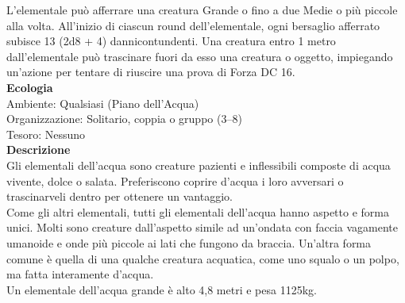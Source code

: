 \begin{multicols}{2}
L'elementale può afferrare una creatura Grande o fino a due Medie o più piccole alla volta. All'inizio di ciascun round dell'elementale, ogni bersaglio afferrato subisce 13 (2d8 + 4) dannicontundenti. Una creatura entro 1 metro dall'elementale può trascinare fuori da esso una  creatura o oggetto, impiegando un'azione per tentare di riuscire una prova di Forza DC  16.\\
\textbf{Ecologia}\\
Ambiente: Qualsiasi (Piano dell'Acqua)\\
Organizzazione: Solitario, coppia o gruppo (3–8)\\
Tesoro: Nessuno\\
\textbf{Descrizione}\\
Gli elementali dell'acqua sono creature pazienti e inflessibili composte di acqua vivente, dolce o salata. Preferiscono coprire d’acqua i loro avversari o trascinarveli dentro per ottenere un vantaggio.\\
Come gli altri elementali, tutti gli elementali dell'acqua hanno aspetto e forma unici. Molti sono creature dall'aspetto simile ad un’ondata con faccia vagamente umanoide e onde più piccole ai lati che fungono da braccia. Un’altra forma comune è quella di una qualche creatura acquatica, come uno squalo o un polpo, ma fatta interamente d'acqua.\\
Un elementale dell'acqua grande è alto 4,8 metri e pesa 1125kg.\\


\end{multicols}
